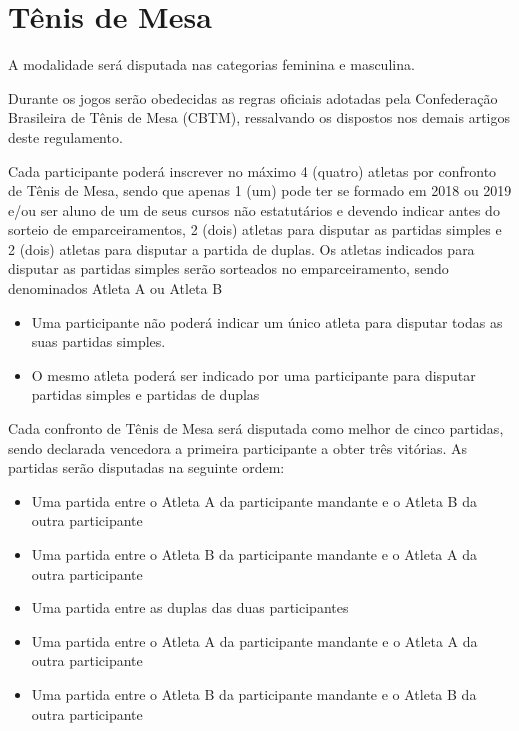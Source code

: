 {\let\clearpage\relax \chapter{Tênis de Mesa}}

\begin{article}
	A modalidade será disputada nas categorias feminina e masculina.
\end{article}

\begin{article}
	Durante os jogos serão obedecidas as regras oficiais adotadas pela Confederação Brasileira de Tênis de Mesa (CBTM), ressalvando os dispostos nos demais artigos deste regulamento.
\end{article}

\begin{article}
	Cada participante poderá inscrever no máximo 4 (quatro) atletas por confronto de Tênis de Mesa, sendo que apenas 1 (um) pode ter se formado em 2018 ou 2019 e/ou ser aluno de um de seus cursos não estatutários e devendo indicar antes do sorteio de emparceiramentos, 2 (dois) atletas para disputar as partidas simples e 2 (dois) atletas para disputar a partida de duplas. Os atletas indicados para disputar as partidas simples serão sorteados no emparceiramento, sendo denominados Atleta A ou Atleta B

	\begin{itemize}[noitemsep]
		\item Uma participante não poderá indicar um único atleta para disputar todas as suas partidas simples.
		\item O mesmo atleta poderá ser indicado por uma participante para disputar partidas simples e partidas de duplas
	\end{itemize}
\end{article}

\noindent
Cada confronto de Tênis de Mesa será disputada como melhor de cinco partidas, sendo declarada vencedora a primeira participante a obter três vitórias. As partidas serão disputadas na seguinte ordem:
\begin{itemize}[noitemsep]
	\item Uma partida entre o Atleta A da participante mandante e o Atleta B da outra participante
	\item Uma partida entre o Atleta B da participante mandante e o Atleta A da outra participante
	\item Uma partida entre as duplas das duas participantes
	\item Uma partida entre o Atleta A da participante mandante e o Atleta A da outra participante
	\item Uma partida entre o Atleta B da participante mandante e o Atleta B da outra participante
\end{itemize}

